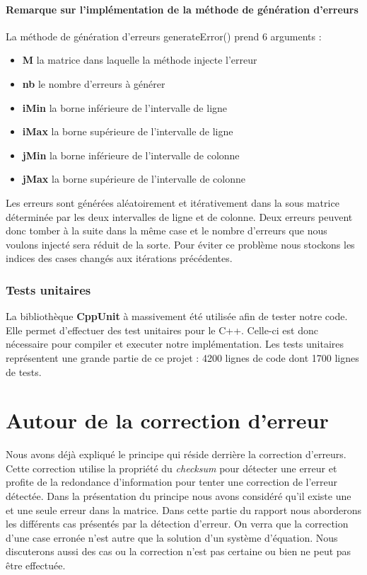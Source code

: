 \documentclass[a4paper, 10pt]{report}
\begin{document}
\subsubsection{Remarque  sur l’implémentation de la méthode de génération d’erreurs }
La méthode de génération d’erreurs generateError() prend 6 arguments :
\begin{itemize}
 \item \textbf{M} la matrice dans laquelle la méthode injecte l'erreur
 \item \textbf{nb} le nombre d'erreurs à générer
 \item \textbf{iMin} la borne inférieure de l'intervalle de ligne
 \item \textbf{iMax} la borne supérieure de l'intervalle de ligne
 \item \textbf{jMin} la borne inférieure de l'intervalle de colonne
 \item \textbf{jMax} la borne supérieure de l'intervalle de colonne
\end{itemize}
Les erreurs sont générées aléatoirement et itérativement dans la sous matrice déterminée par les deux intervalles de 
ligne et de colonne. Deux erreurs peuvent donc tomber à la suite dans la même case et le nombre d’erreurs que nous 
voulons injecté sera réduit de la sorte. Pour éviter ce problème nous stockons les indices des cases changés aux 
itérations précédentes.

\subsection{Tests unitaires}
La bibliothèque \textbf{CppUnit} \cite{CppUnit} à massivement été utilisée afin de tester notre code.
Elle permet d'effectuer des test unitaires pour le C++.\newline
Celle-ci est donc nécessaire pour compiler et executer notre implémentation.\newline
Les tests unitaires représentent une grande partie de ce projet : 4200 lignes de code dont 1700 lignes de tests.

\chapter{Autour de la correction d'erreur}
Nous avons déjà expliqué le principe qui réside derrière la correction d’erreurs. Cette correction utilise la propriété 
du \textit{checksum} pour détecter une erreur et profite de la redondance d’information pour tenter une correction de 
l’erreur détectée. Dans la présentation du principe nous avons considéré qu’il existe une et une seule erreur dans la matrice. 
Dans cette partie du rapport nous aborderons les différents cas présentés par la détection d’erreur. On verra que la 
correction d’une case erronée n’est autre que la solution d’un système d’équation. Nous discuterons aussi des cas ou 
la correction n’est pas certaine ou bien ne peut pas être effectuée.
\end{document}
